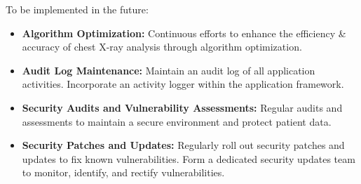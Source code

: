 \documentclass{article}
\begin{document}
To be implemented in the future: 
\begin{itemize}
    \item \textbf{Algorithm Optimization:} Continuous efforts to enhance the efficiency \& accuracy of chest X-ray analysis through algorithm optimization.
    \item \textbf{Audit Log Maintenance:} Maintain an audit log of all application activities.
    Incorporate an activity logger within the application framework.
    \item \textbf{Security Audits and Vulnerability Assessments:} Regular audits and assessments to maintain a secure environment and protect patient data.
    \item \textbf{Security Patches and Updates:} Regularly roll out security patches and updates to fix known vulnerabilities. Form a dedicated security updates team to monitor, identify, and rectify vulnerabilities.
\end{itemize}
\end{document}
